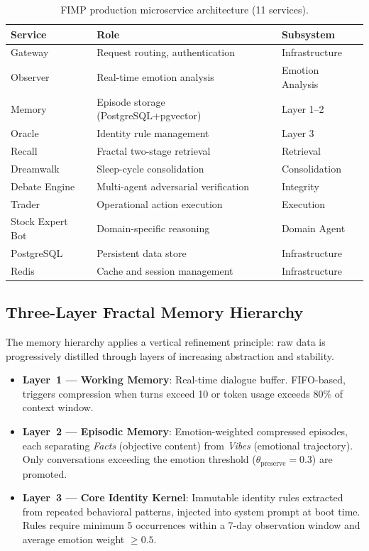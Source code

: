 \documentclass[11pt,a4paper]{article}
\begin{document}
\begin{table}[h]
\centering
\caption{FIMP production microservice architecture (11 services).}
\label{tab:services}
\small
\begin{tabular}{@{}lll@{}}
\toprule
\textbf{Service} & \textbf{Role} & \textbf{Subsystem} \\
\midrule
Gateway      & Request routing, authentication     & Infrastructure \\
Observer     & Real-time emotion analysis           & Emotion Analysis \\
Memory       & Episode storage (PostgreSQL+pgvector)& Layer 1--2 \\
Oracle       & Identity rule management             & Layer 3 \\
Recall       & Fractal two-stage retrieval          & Retrieval \\
Dreamwalk    & Sleep-cycle consolidation            & Consolidation \\
Debate Engine& Multi-agent adversarial verification & Integrity \\
Trader       & Operational action execution          & Execution \\
Stock Expert Bot & Domain-specific reasoning         & Domain Agent \\
PostgreSQL   & Persistent data store                & Infrastructure \\
Redis        & Cache and session management          & Infrastructure \\
\bottomrule
\end{tabular}
\end{table}

\subsection{Three-Layer Fractal Memory Hierarchy}

The memory hierarchy applies a vertical refinement principle: raw data is progressively
distilled through layers of increasing abstraction and stability.

\begin{itemize}[itemsep=3pt]
  \item \textbf{Layer~1 --- Working Memory}: Real-time dialogue buffer. FIFO-based,
        triggers compression when turns exceed 10 or token usage exceeds 80\% of context
        window.
  \item \textbf{Layer~2 --- Episodic Memory}: Emotion-weighted compressed episodes, each
        separating \emph{Facts} (objective content) from \emph{Vibes} (emotional trajectory).
        Only conversations exceeding the emotion threshold
        ($\theta_{\text{preserve}} = 0.3$) are promoted.
  \item \textbf{Layer~3 --- Core Identity Kernel}: Immutable identity rules extracted from
        repeated behavioral patterns, injected into system prompt at boot time. Rules require
        minimum 5 occurrences within a 7-day observation window and average emotion weight
        $\geq 0.5$.
\end{itemize}
\end{document}

